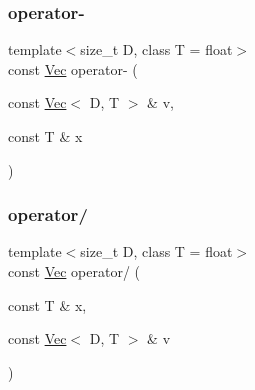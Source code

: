 \mbox{\label{classtrimesh_1_1Vec_a61e303a5a0aa76761b8f7fa19b6e21b0}} 
\subsubsection{\texorpdfstring{operator-\/}{operator-}\hspace{0.1cm}{\footnotesize\ttfamily [2/2]}}
{\footnotesize\ttfamily template$<$size\+\_\+t D, class T = float$>$ \\
const \hyperlink{classtrimesh_1_1Vec}{Vec} operator-\/ (\begin{DoxyParamCaption}\item[{const \hyperlink{classtrimesh_1_1Vec}{Vec}$<$ D, T $>$ \&}]{v,  }\item[{const T \&}]{x }\end{DoxyParamCaption})\hspace{0.3cm}{\ttfamily [friend]}}

\mbox{\label{classtrimesh_1_1Vec_abbf885c9e1540fbd51fcf96c4672c091}} 
\subsubsection{\texorpdfstring{operator/}{operator/}\hspace{0.1cm}{\footnotesize\ttfamily [1/2]}}
{\footnotesize\ttfamily template$<$size\+\_\+t D, class T = float$>$ \\
const \hyperlink{classtrimesh_1_1Vec}{Vec} operator/ (\begin{DoxyParamCaption}\item[{const T \&}]{x,  }\item[{const \hyperlink{classtrimesh_1_1Vec}{Vec}$<$ D, T $>$ \&}]{v }\end{DoxyParamCaption})\hspace{0.3cm}{\ttfamily [friend]}}

\mbox{\label{classtrimesh_1_1Vec_ac9015a7c1a54407b1dabed7b7ebc536a}} 

